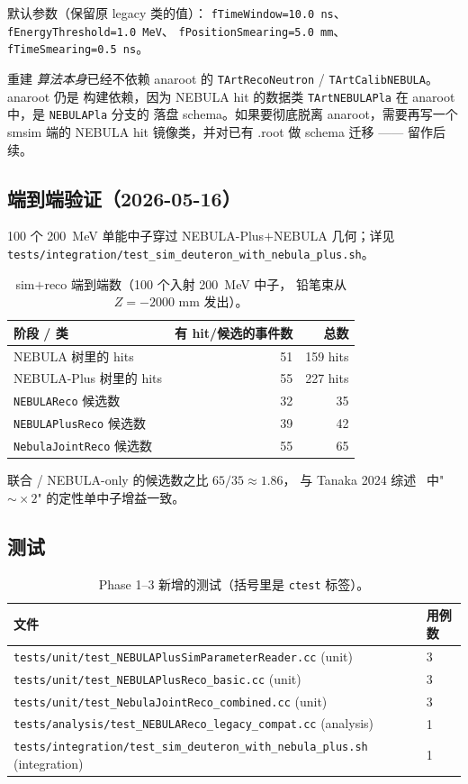 \documentclass[a4paper,11pt]{ctexart}
\newcommand{\NEB}{NEBULA}
\newcommand{\NPL}{NEBULA-Plus}
\begin{document}
默认参数（保留原 legacy 类的值）：
\texttt{fTimeWindow=10.0\,ns}、\texttt{fEnergyThreshold=1.0\,MeV}、
\texttt{fPositionSmearing=5.0\,mm}、\texttt{fTimeSmearing=0.5\,ns}。

重建 \emph{算法本身}已经不依赖 anaroot 的
\texttt{TArtRecoNeutron} / \texttt{TArtCalibNEBULA}。anaroot 仍是
构建依赖，因为 \NEB{} hit 的数据类
\texttt{TArtNEBULAPla} 在 anaroot 中，是 \texttt{NEBULAPla} 分支的
落盘 schema。如果要彻底脱离 anaroot，需要再写一个 smsim 端的
\NEB{} hit 镜像类，并对已有 .root 做 schema 迁移 —— 留作后续。

\subsection{端到端验证（2026-05-16）}

100 个 \SI{200}{MeV} 单能中子穿过 \NPL{}$+$\NEB{} 几何；详见
\texttt{tests/integration/test\_sim\_deuteron\_with\_nebula\_plus.sh}。

\begin{table}[h]
\centering
\caption{sim$+$reco 端到端数（100 个入射 \SI{200}{MeV} 中子，
铅笔束从 $Z=-2000$ mm 发出）。}
\begin{tabular}{lrr}
\toprule
阶段 / 类 & 有 hit/候选的事件数 & 总数\\
\midrule
\NEB{} 树里的 hits        & 51 & 159 hits\\
\NPL{} 树里的 hits        & 55 & 227 hits\\
\midrule
\texttt{NEBULAReco}      候选数 & 32 & 35\\
\texttt{NEBULAPlusReco}  候选数 & 39 & 42\\
\texttt{NebulaJointReco} 候选数 & 55 & 65\\
\bottomrule
\end{tabular}
\end{table}

联合 / \NEB{}-only 的候选数之比 $65/35\approx 1.86$，
与 Tanaka 2024 综述~\cite{tanaka2024} 中"$\sim\!\!\times 2$"
的定性单中子增益一致。

\subsection{测试}

\begin{table}[h]
\centering
\caption{Phase 1--3 新增的测试（括号里是 \texttt{ctest} 标签）。}
\begin{tabular}{ll}
\toprule
文件 & 用例数\\
\midrule
\texttt{tests/unit/test\_NEBULAPlusSimParameterReader.cc}    (unit)         & 3 \\
\texttt{tests/unit/test\_NEBULAPlusReco\_basic.cc}            (unit)         & 3 \\
\texttt{tests/unit/test\_NebulaJointReco\_combined.cc}        (unit)         & 3 \\
\texttt{tests/analysis/test\_NEBULAReco\_legacy\_compat.cc}   (analysis)     & 1 \\
\texttt{tests/integration/test\_sim\_deuteron\_with\_nebula\_plus.sh} (integration) & 1 \\
\bottomrule
\end{tabular}
\end{table}
\end{document}
